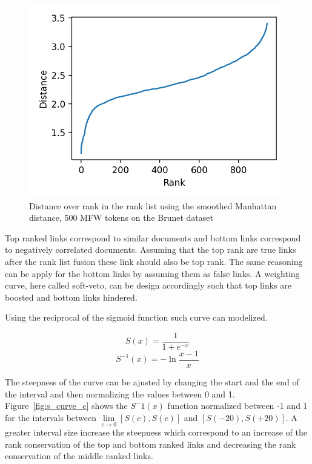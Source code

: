 \begin{figure}
  \centering
  \caption{Distance over rank in the rank list using the smoothed Manhattan distance, 500 MFW tokens on the Brunet dataset}
  \label{fig:distance_over_rank}
  \includegraphics[width=\linewidth]{img/distance_over_rank.png}
\end{figure}

Top ranked links correspond to similar documents and bottom links correspond to negatively correlated documents.
Assuming that the top rank are true links after the rank list fusion these link should also be top rank.
The same reasoning can be apply for the bottom links by assuming them as false links.
A weighting curve, here called soft-veto, can be design accordingly such that top links are boosted and bottom links hindered.

Using the reciprocal of the sigmoid function such curve can modelized.

\begin{equation}
  \label{eq:sigmoid}
  S(x) = \frac{1}{1+e^{-x}}
\end{equation}
\begin{equation}
  \label{eq:sigmoid_r}
  S^{-1}(x) = -\ln{\frac{x-1}{x}}
\end{equation}

The steepness of the curve can be ajusted by changing the start and the end of the interval and then normalizing the values between 0 and 1.
Figure~\ref{fig:s_curve_c} shows the $S^-1(x)$ function normalized between -1 and 1 for the intervals between $\lim\limits_{c \rightarrow 0} \left[S(c), S(c)\right]$ and $\left[S(-20), S(+20)\right]$.
A greater interval size increase the steepness which correspond to an increase of the rank conservation of the top and bottom ranked links and decreasing the rank conservation of the middle ranked links.

